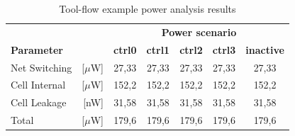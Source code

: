 \begin{table}[hbpt]
    \centering
    \begin{tabular}{lrccccc}
         & & \multicolumn{5}{c}{\textbf{Power scenario}} \\
        \cline{3-7}
        \textbf{Parameter} &  & \textbf{ctrl0} & \textbf{ctrl1} & \textbf{ctrl2} & \textbf{ctrl3} & \textbf{inactive} \\
        \toprule
        Net Switching & [$\mu$W] & 27,33 & 27,33 & 27,33 & 27,33 & 27,33 \\
        Cell Internal & [$\mu$W] & 152,2 & 152,2 & 152,2 & 152,2 & 152,2 \\
        Cell Leakage & [nW] & 31,58 & 31,58 & 31,58 & 31,58 & 31,58 \\
        Total & [$\mu$W] & 179,6  & 179,6 & 179,6 & 179,6 & 179,6 \\
        \bottomrule
    \end{tabular}
    \caption{Tool-flow example power analysis results}
    \label{tab:powestreportex}
\end{table}